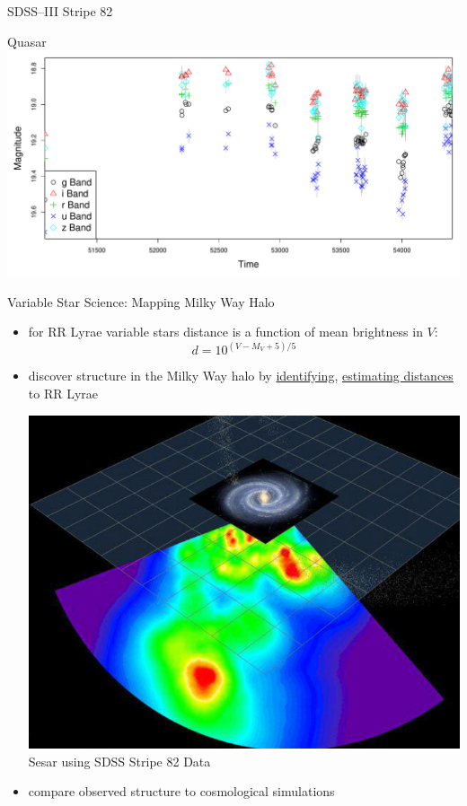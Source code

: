 \documentclass[12pt]{beamer}
\begin{document}
\begin{frame}{SDSS--III Stripe 82 \cite{ivezic2007sloan}}
\begin{center}
Quasar\\
\includegraphics[scale=.15]{figs/unfolded_7904669.pdf}
\end{center}


\end{frame}


\begin{frame}{Variable Star Science: Mapping Milky Way Halo}
\begin{itemize}
\item for RR Lyrae variable stars distance is a function of mean brightness in $V$:
\begin{equation*}
d = 10^{(V-M_V +5)/5}
\end{equation*}
\item discover structure in the Milky Way halo by \underline{identifying}, \underline{estimating distances} to RR Lyrae


\begin{center}
\includegraphics[scale=.2]{figs/sesar_map.png}\\
\footnotesize{Sesar \cite{sesar2010light} using SDSS Stripe 82 Data}
\end{center}

\item compare observed structure to cosmological simulations

\end{itemize}

\end{frame}
\end{document}
